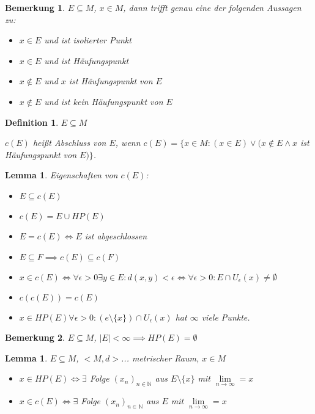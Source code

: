 \documentclass[twocolumn]{article}
\newtheorem{lemma}[theorem]{Lemma}
\newtheorem{definition}{Definition}[section]
\newtheorem*{remark}{Bemerkung}
\newcommand*{\logeq}{\Leftrightarrow}
\begin{document}
\begin{remark}
	$E\subseteq M$, $x \in M$, dann trifft genau eine der folgenden Aussagen zu:
	
	\begin{itemize}
		\item $x \in E$ und ist isolierter Punkt
		\item $x \in E$ und ist Häufungspunkt
		\item $x \notin E$ und $x$ ist Häufungspunkt von $E$
		\item $x \notin E$ und ist kein Häufungspunkt von $E$
	\end{itemize}
\end{remark}

\begin{definition}
	$E\subseteq M$
	
	$c(E)$ heißt Abschluss von $E$, wenn $c(E)=\{x \in M : (x \in E) \lor (x \notin E \land x$ ist Häufungspunkt von  $E)\}$.
\end{definition}

\begin{lemma}
	Eigenschaften von $c(E)$:
	
	\begin{itemize}
		\item $E \subseteq c(E)$
		\item $c(E) = E \cup HP(E)$
		\item $E = c(E) \logeq E$ ist abgeschlossen
		\item $E \subseteq F \implies c(E)\subseteq c(F)$
		\item $x \in c(E)\logeq \forall \epsilon > 0 \exists y \in E : d(x,y)<\epsilon \logeq \forall \epsilon > 0 : E \cap U_{\epsilon}(x)\neq \emptyset$
		\item $c(c(E))=c(E)$
		\item $x \in HP(E) \forall \epsilon > 0 : (e\setminus\{x\})\cap U_{\epsilon}(x)$ hat $\infty$ viele Punkte.
	\end{itemize}
\end{lemma}

\begin{remark}
	$E\subseteq M$, $|E|<\infty \implies HP(E)=\emptyset$
\end{remark}

\begin{lemma}
	$E \subseteq M$, $<M,d>$... metrischer Raum, $x \in M$
	
	\begin{itemize}
		\item $x \in HP(E)\logeq \exists$ Folge $(x_n)_{n \in \mathbb{N}}$ aus $E\setminus\{x\}$ mit $\lim\limits_{n\rightarrow\infty}=x$
		\item $x \in c(E)\logeq \exists$ Folge $(x_n)_{n \in \mathbb{N}}$ aus $E$ mit $\lim\limits_{n\rightarrow\infty}=x$
	\end{itemize}
\end{lemma}
\end{document}
